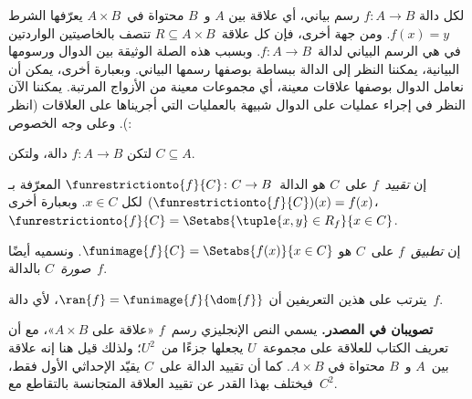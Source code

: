 \documentclass[../../../include/open-logic-section]{subfiles}
\begin{document}
\begin{explain}
لكل دالة $f\colon A \to B$ رسم بياني، أي علاقة بين $A$ و~$B$
محتواة في~$A \times B$ يعرّفها الشرط $f(x) = y$. ومن جهة أخرى، فإن كل علاقة~$R
\subseteq A \times B$ تتصف بالخاصيتين الواردتين في
 هي الرسم البياني لدالة~$f \colon A \to
B$. وبسبب هذه الصلة الوثيقة بين الدوال ورسومها البيانية، يمكننا
النظر إلى الدالة ببساطة بوصفها رسمها البياني. وبعبارة أخرى، يمكن
أن نعامل الدوال بوصفها علاقات معينة، أي مجموعات معينة من الأزواج المرتبة.
يمكننا الآن
النظر في إجراء عمليات على الدوال شبيهة بالعمليات التي أجريناها على
العلاقات (انظر ). وعلى وجه الخصوص:
\end{explain}

\begin{defn}
لتكن $f \colon A \to B$ دالة، ولتكن $C\subseteq A$.

إن \emph{تقييد}~$f$ على~$C$ هو
الدالة~$\funrestrictionto{f}{C}\colon C \to B$ المعرّفة بـ
$(\funrestrictionto{f}{C})(x) = f(x)$ لكل $x \in C$. وبعبارة
أخرى، $\funrestrictionto{f}{C} = \Setabs{\tuple{x, y} \in R_f}{x \in
C}$.

إن \emph{تطبيق}~$f$ على~$C$ هو $\funimage{f}{C} =
\Setabs{f(x)}{x \in C}$. ونسميه أيضًا \emph{صورة}~$C$
بالدالة~$f$.
\end{defn}

\begin{explain}
يترتب على هذين التعريفين أن $\ran{f} =
\funimage{f}{\dom{f}}$، لأي دالة~$f$.
\end{explain}

\begin{explain}
\textbf{تصويبان في المصدر.} يسمي النص الإنجليزي رسم~$f$ «علاقة على
$A\times B$»، مع أن تعريف الكتاب للعلاقة على مجموعة~$U$ يجعلها
جزءًا من~$U^2$؛ ولذلك قيل هنا إنه علاقة بين~$A$ و~$B$ محتواة في
$A\times B$. كما أن تقييد الدالة على~$C$ يقيّد الإحداثي الأول فقط،
فيختلف بهذا القدر عن تقييد العلاقة المتجانسة بالتقاطع مع~$C^2$.
\end{explain}
\end{document}
